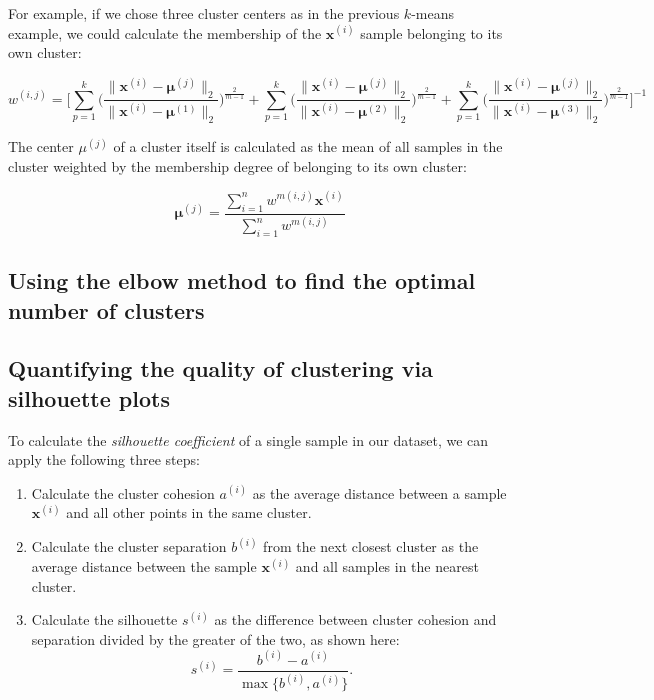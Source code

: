 \documentclass[letterpaper]{report}
\begin{document}
For example, if we chose three cluster centers as in the previous $k$-means example, we could calculate the membership of the $\mathbf{x}^{(i)}$ sample belonging to its own cluster:

\[
w^{(i, j)} = \Bigg[ \sum^{k}_{p=1} \Bigg(  \frac{\lVert \mathbf{x}^{(i)} - \mathbf{\mu}^{(j)}  \rVert_2}{\lVert \mathbf{x}^{(i)} - \mathbf{\mu}^{(1)} \rVert_2}   \Bigg)^{\frac{2}{m-1}} + \sum^{k}_{p=1} \Bigg(  \frac{\lVert \mathbf{x}^{(i)} - \mathbf{\mu}^{(j)}  \rVert_2}{\lVert \mathbf{x}^{(i)} - \mathbf{\mu}^{(2)} \rVert_2}   \Bigg)^{\frac{2}{m-1}} + \sum^{k}_{p=1} \Bigg(  \frac{\lVert \mathbf{x}^{(i)} - \mathbf{\mu}^{(j)}  \rVert_2}{\lVert \mathbf{x}^{(i)} - \mathbf{\mu}^{(3)} \rVert_2}   \Bigg)^{\frac{2}{m-1}} \Bigg]^{-1}
\]

The center $\mu^{(j)}$ of a cluster itself is calculated as the mean of all samples in the cluster weighted by the membership degree of belonging to its own cluster:

\[
\mathbf{\mu}^{(j)} = \frac{\sum_{i=1}^{n} w^{m(i, j)} \mathbf{x}^{(i)}}{\sum_{i=1}^{n} w^{m(i, j)}}
\]

\subsection{Using the elbow method to find the optimal number of clusters}
\subsection{Quantifying the quality of clustering via silhouette plots}

To calculate the \textit{silhouette coefficient} of a single sample in our dataset, we can apply the following three steps:

\begin{enumerate}
\item Calculate the cluster cohesion $a^{(i)}$ as the average distance between a sample $\mathbf{x}^{(i)}$ and all other points in the same cluster.
\item Calculate the cluster separation $b^{(i)}$ from the next closest cluster as the average distance between the sample $\mathbf{x}^{(i)}$ and all samples in the nearest cluster.
\item Calculate the silhouette $s^{(i)}$ as the difference between cluster cohesion and separation divided by the greater of the two, as shown here:
\[
s^{(i)} = \frac{b^{(i)} - a^{(i)}}{\max \{ b^{(i)}, a^{(i)}  \}}.
\]
\end{enumerate}
\end{document}
